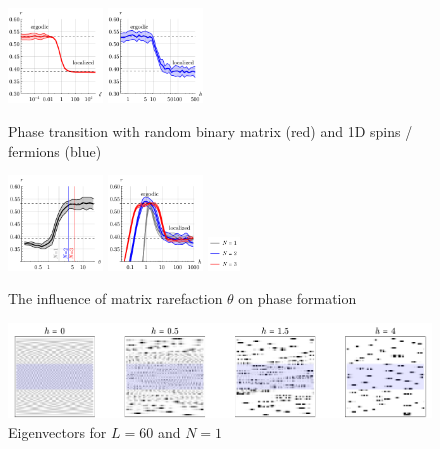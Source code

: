 
\begin{figure}[h]
    \centering
    \includegraphics[width=0.225\textwidth]{imgs/erg_reg_add1.pdf}
    \hspace{10 mm} 
    \includegraphics[width=0.225\textwidth]{imgs/erg_reg_add2.pdf}
    \caption{Phase transition with random binary matrix (red) and 1D  spins / fermions (blue)}
\end{figure}


\begin{figure}[h]
    \centering
    \includegraphics[align=c, width=0.225\textwidth]{imgs/ergodic_reg.pdf}
    \hspace{10 mm} 
    \includegraphics[align=c, width=0.225\textwidth]{imgs/transition.pdf}
    \hspace{5 mm} 
    \includegraphics[align=c, width=0.075\textwidth]{imgs/transition_leg.pdf}
    \caption{
    	The influence of matrix rarefaction $\theta$ on phase formation
    }
\end{figure}

\begin{figure}[h]
    \centering
    \includegraphics{imgs/evecs.pdf}
    \caption{Eigenvectors for $L=60$ and $N=1$}
\end{figure}





% 
% 